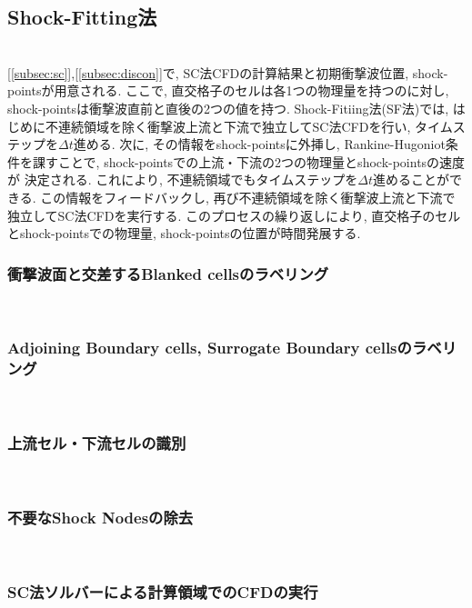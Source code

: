 \documentclass[a4j]{jarticle}
\begin{document}
\subsection{Shock-Fitting法}
\mbox{}\\[-3.0ex]

[\ref{subsec:sc}],[\ref{subsec:discon}]で, SC法CFDの計算結果と初期衝撃波位置, shock-pointsが用意される.
ここで, 直交格子のセルは各1つの物理量を持つのに対し, shock-pointsは衝撃波直前と直後の2つの値を持つ.
Shock-Fitiing法(SF法)では, はじめに不連続領域を除く衝撃波上流と下流で独立してSC法CFDを行い, タイムステップを$\Delta t$進める.
次に, その情報をshock-pointsに外挿し, Rankine-Hugoniot条件を課すことで, shock-pointsでの上流・下流の2つの物理量とshock-pointsの速度が
決定される. これにより, 不連続領域でもタイムステップを$\Delta t$進めることができる. この情報をフィードバックし, 再び不連続領域を除く衝撃波上流と下流で独立してSC法CFDを実行する.
このプロセスの繰り返しにより, 直交格子のセルとshock-pointsでの物理量, shock-pointsの位置が時間発展する. 

\subsubsection{衝撃波面と交差するBlanked cellsのラベリング} \label{subsubsec:exclude}
\mbox{}\\[-1.0ex]


\subsubsection{Adjoining Boundary cells, Surrogate Boundary cellsのラベリング} \label{subsubsec:boundary}
\mbox{}\\[-1.0ex]


\subsubsection{上流セル・下流セルの識別} \label{subsubsec:udflow}
\mbox{}\\[-1.0ex]


\subsubsection{不要なShock Nodesの除去} \label{subsubsec:remove}
\mbox{}\\[-1.0ex]


\subsubsection{SC法ソルバーによる計算領域でのCFDの実行} \label{subsubsec:sc}
\mbox{}\\[-1.0ex]
\end{document}
